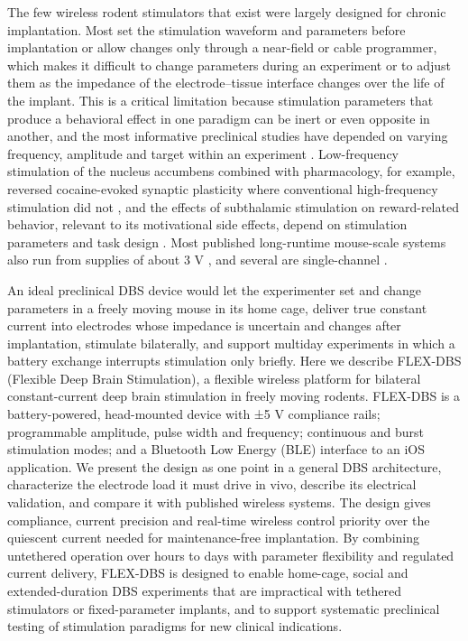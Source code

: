 The few wireless rodent stimulators that exist were largely designed for chronic implantation. Most set the stimulation waveform and parameters before implantation or allow changes only through a near-field or cable programmer, which makes it difficult to change parameters during an experiment or to adjust them as the impedance of the electrode--tissue interface changes over the life of the implant. This is a critical limitation because stimulation parameters that produce a behavioral effect in one paradigm can be inert or even opposite in another, and the most informative preclinical studies have depended on varying frequency, amplitude and target within an experiment \citep{murphy2021}. Low-frequency stimulation of the nucleus accumbens combined with pharmacology, for example, reversed cocaine-evoked synaptic plasticity where conventional high-frequency stimulation did not \citep{creed2015}, and the effects of subthalamic stimulation on reward-related behavior, relevant to its motivational side effects, depend on stimulation parameters and task design \citep{vachez2020}. Most published long-runtime mouse-scale systems also run from supplies of about 3 V \citep{paulat2026,grotemeyer2024,fleischer2020,alpaugh2019,kouzani2013}, and several are single-channel \citep{grotemeyer2024,fleischer2020,alpaugh2019,kouzani2013}.

An ideal preclinical DBS device would let the experimenter set and change parameters in a freely moving mouse in its home cage, deliver true constant current into electrodes whose impedance is uncertain and changes after implantation, stimulate bilaterally, and support multiday experiments in which a battery exchange interrupts stimulation only briefly. Here we describe FLEX-DBS (Flexible Deep Brain Stimulation), a flexible wireless platform for bilateral constant-current deep brain stimulation in freely moving rodents. FLEX-DBS is a battery-powered, head-mounted device with ±5 V compliance rails; programmable amplitude, pulse width and frequency; continuous and burst stimulation modes; and a Bluetooth Low Energy (BLE) interface to an iOS application. We present the design as one point in a general DBS architecture, characterize the electrode load it must drive in vivo, describe its electrical validation, and compare it with published wireless systems. The design gives compliance, current precision and real-time wireless control priority over the quiescent current needed for maintenance-free implantation. By combining untethered operation over hours to days with parameter flexibility and regulated current delivery, FLEX-DBS is designed to enable home-cage, social and extended-duration DBS experiments that are impractical with tethered stimulators or fixed-parameter implants, and to support systematic preclinical testing of stimulation paradigms for new clinical indications.
